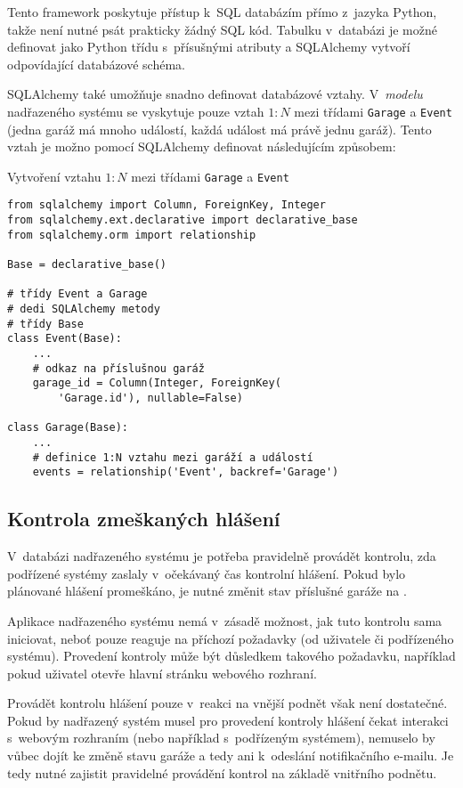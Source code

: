 Tento framework poskytuje přístup k~SQL databázím přímo z~jazyka Python, takže není nutné psát prakticky žádný SQL kód. Tabulku v~databázi je možné definovat jako Python třídu s~přísušnými atributy a SQLAlchemy vytvoří odpovídající databázové schéma. 

SQLAlchemy také umožňuje snadno definovat databázové vztahy. V~\textit{modelu} nadřazeného systému se vyskytuje pouze vztah $1:N$ mezi třídami \texttt{Garage} a \texttt{Event} (jedna garáž má mnoho událostí, každá událost má právě jednu garáž). Tento vztah je možno pomocí SQLAlchemy definovat následujícím způsobem:

\begin{listing}[htbp]
\caption{\label{lst:db_relationship} Vytvoření vztahu $1:N$ mezi třídami \texttt{Garage} a \texttt{Event}}
\begin{verbatim}
from sqlalchemy import Column, ForeignKey, Integer
from sqlalchemy.ext.declarative import declarative_base
from sqlalchemy.orm import relationship

Base = declarative_base()

# třídy Event a Garage
# dedi SQLAlchemy metody
# třídy Base
class Event(Base):
    ...
    # odkaz na příslušnou garáž
    garage_id = Column(Integer, ForeignKey(
        'Garage.id'), nullable=False)

class Garage(Base): 
    ...
    # definice 1:N vztahu mezi garáží a událostí
    events = relationship('Event', backref='Garage')
\end{verbatim}
\end{listing}

\subsection{Kontrola zmeškaných hlášení}

V~databázi nadřazeného systému je potřeba pravidelně provádět kontrolu, zda podřízené systémy zaslaly v~očekávaný čas kontrolní hlášení. Pokud bylo plánované hlášení promeškáno, je nutné změnit stav příslušné garáže na .

Aplikace nadřazeného systému nemá v~zásadě možnost, jak tuto kontrolu sama iniciovat, neboť pouze reaguje na příchozí požadavky (od uživatele či podřízeného systému). Provedení kontroly může být důsledkem takového požadavku, například pokud uživatel otevře hlavní stránku webového rozhraní. 

Provádět kontrolu hlášení pouze v~reakci na vnější podnět však není dostatečné. Pokud by nadřazený systém musel pro provedení kontroly hlášení čekat interakci s~webovým rozhraním (nebo například s~podřízeným systémem), nemuselo by vůbec dojít ke změně stavu garáže a tedy ani k~odeslání notifikačního e-mailu. Je tedy nutné zajistit pravidelné provádění kontrol na základě vnitřního podnětu.

